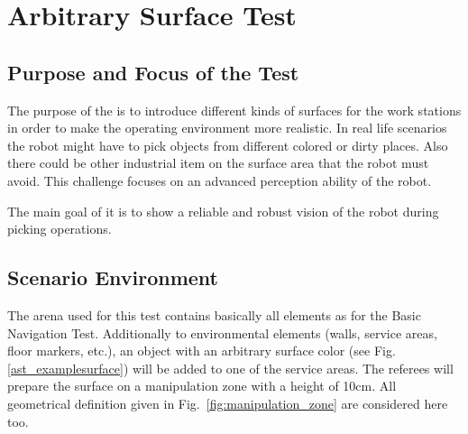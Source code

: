 
\newpage
\section{Arbitrary Surface Test}

\subsection{Purpose and Focus of the Test}
The purpose of the  is to introduce different kinds of surfaces for the work stations in order to make the operating environment more realistic. In real life scenarios the robot might have to pick objects from different colored or dirty places. Also there could be other industrial item on the surface area that the robot must avoid. This challenge focuses on an advanced perception ability of the robot. \par The main goal of it is to show a reliable and robust vision of the robot during picking operations.

\subsection{Scenario Environment}
The arena used for this test contains basically all elements as for the Basic Navigation Test. Additionally to environmental elements (walls, service areas, floor markers, etc.), an object with an arbitrary surface color (see Fig. \ref{ast_examplesurface}) will be added to one of the service areas. The referees will prepare the surface on a manipulation zone with a height of 10cm. All geometrical definition given in Fig.~\ref{fig:manipulation_zone} are considered here too.

